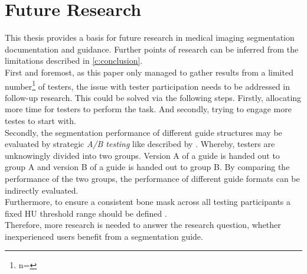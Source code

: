 \section*{Future Research}\label{c:future}
This thesis provides a basis for future research in medical imaging segmentation documentation and guidance.
Further points of research can be inferred from the limitations described in \cref{c:conclusion}.\\
First and foremost, as this paper only managed to gather results from a limited number\footnote{n=\numberofTesters} of testers, the issue with tester participation needs to be addressed in follow-up research.
This could be solved via the following steps.
Firstly, allocating more time for testers to perform the task.
And secondly, trying to engage more testes to start with.\\
Secondly, the segmentation performance of different guide structures may be evaluated by strategic \textit{A/B testing} like described by \citeauthor{brataUserExperienceImprovement2020}.
Whereby, testers are unknowingly divided into two groups.
Version A of a guide is handed out to group A and version B of a guide is handed out to group B.
By comparing the performance of the two groups, the performance of different guide formats can be indirectly evaluated.\\
Furthermore, to ensure a consistent bone mask across all testing participants a fixed HU threshold range should be defined \cite{chavezGuidelinesMicroComputed2021}.\\
Therefore, more research is needed to answer the research question, whether inexperienced users benefit from a segmentation guide.
